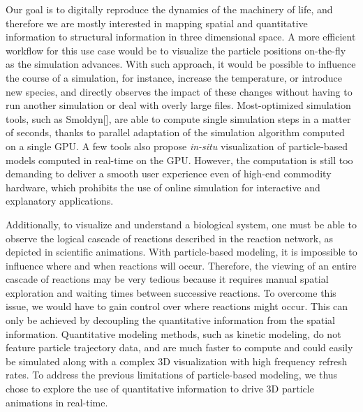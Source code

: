 Our goal is to digitally reproduce the dynamics of the machinery of life, and therefore we are mostly interested in mapping spatial and quantitative information to structural information in three dimensional space. 
A more efficient workflow for this use case would be to visualize the particle positions on-the-fly as the simulation advances.
With such approach, it would be possible to influence the course of a simulation, for instance, increase the temperature, or introduce new species, and directly observes the impact of these changes without having to run another simulation or deal with overly large files.
Most-optimized simulation tools, such as Smoldyn[], are able to compute single simulation steps in a matter of seconds, thanks to parallel adaptation of the simulation algorithm computed on a single GPU.
A few tools also propose \textit{in-situ} visualization of particle-based models computed in real-time on the GPU.
However, the computation is still too demanding to deliver a smooth user experience even of high-end commodity hardware, which prohibits the use of online simulation for interactive and explanatory applications.

Additionally, to visualize and understand a biological system, one must be able to observe the logical cascade of reactions described in the reaction network, as depicted in scientific animations.
With particle-based modeling, it is impossible to influence where and when reactions will occur.
Therefore, the viewing of an entire cascade of reactions may be very tedious because it requires manual spatial exploration and waiting times between successive reactions.
To overcome this issue, we would have to gain control over where reactions might occur.
This can only be achieved by decoupling the quantitative information from the spatial information.
Quantitative modeling methods, such as kinetic modeling, do not feature particle trajectory data, and are much faster to compute and could easily be simulated along with a complex 3D visualization with high frequency refresh rates.
To address the previous limitations of particle-based modeling, we thus chose to explore the use of quantitative information to drive 3D particle animations in real-time.

